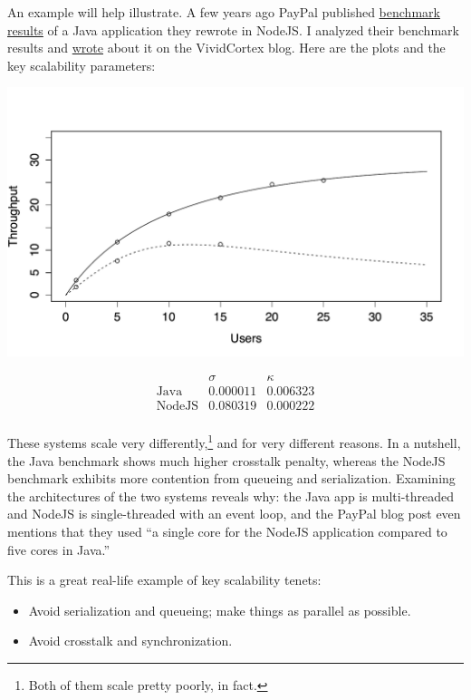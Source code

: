 \documentclass{vivid_layout}
\begin{document}
An example will help illustrate. A few years ago PayPal published
\href{https://www.paypal-engineering.com/2013/11/22/node-js-at-paypal/}{benchmark
results} of a Java application they rewrote in NodeJS. I analyzed their
benchmark results and
\href{https://www.vividcortex.com/blog/2013/12/09/analysis-of-paypals-node-vs-java-benchmarks/}{wrote} about it on the VividCortex blog.
Here are the plots and the key scalability parameters:
\begin{center}
\includegraphics[width=.85\linewidth]{scalability/paypal}
\end{center}
\[
\begin{array}{lcc}
& \sigma & \kappa \\
\mbox{Java} & 0.000011 & 0.006323 \\
\mbox{NodeJS} &  0.080319 & 0.000222 \\
\end{array}
\]

These systems scale very differently,\footnote{Both of them scale pretty poorly,
in fact.} and for very different reasons.  In a nutshell, the Java benchmark
shows much higher crosstalk penalty, whereas the NodeJS benchmark exhibits more
contention from queueing and serialization. Examining the architectures of the
two systems reveals why: the Java app is multi-threaded and NodeJS is
single-threaded with an event loop, and the PayPal blog post even mentions that
they used ``a single core for the NodeJS application compared to five cores in
Java.''

This is a great real-life example of key scalability tenets:

\begin{itemize}
\item Avoid serialization and queueing; make things as parallel as possible.
\item Avoid crosstalk and synchronization.
\end{itemize}
\end{document}
